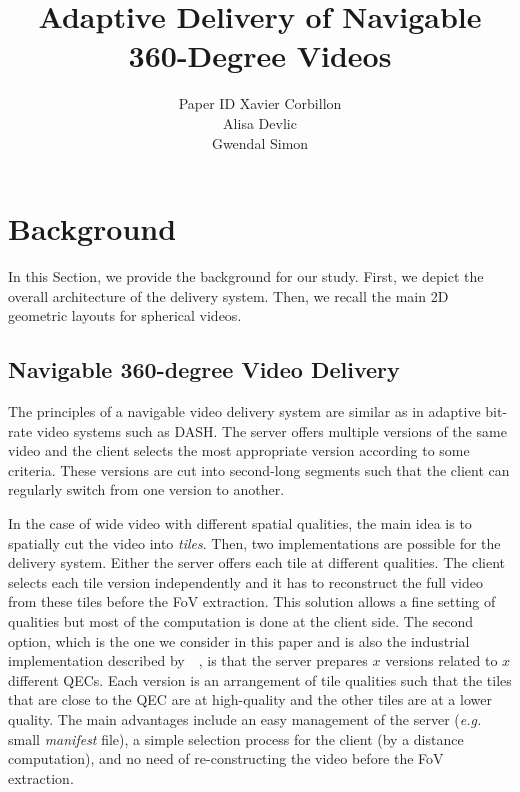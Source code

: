 \documentclass{sig-alternate}
\title{Adaptive Delivery of Navigable 360-Degree Videos}
\author{ 
\alignauthor
\ifdoubleBlinded
        Paper ID 
\else
  Xavier Corbillon\\
  \affaddr{T\'{e}l\'{e}com Bretagne, IRISA, France}%
\alignauthor
  Alisa Devlic\\
  \affaddr{T\'{e}l\'{e}com Bretagne, IRISA, France}%
\alignauthor
  Gwendal Simon\\
  \affaddr{T\'{e}l\'{e}com Bretagne, IRISA, France}%
\fi
}
\renewcommand\citet[1]{\citeauthor{#1}~\cite{#1}} %
\begin{document}

\maketitle





\section{Background}

In this Section, we provide the background for our study.
First, we depict the overall architecture of the delivery system.
Then, we recall the main 2D geometric layouts for spherical videos.

\subsection{Navigable 360-degree Video Delivery}

The principles of a navigable video delivery system are similar as in adaptive bit-rate
video systems such as \ac{DASH}. The server offers multiple versions of the same video 
and the client
selects the most appropriate version according to some criteria. These versions 
are cut into second-long segments such that the client can regularly switch from one 
version to another.

In the case of wide video with different spatial qualities, the main idea is to spatially cut 
the video into \emph{tiles}.
Then, two implementations are possible for the delivery system. Either the server 
offers each tile at different qualities. The client selects each tile version independently 
and it has to reconstruct
the full video from these tiles before the \ac{FoV} extraction. This solution allows a 
fine setting of qualities but 
most of the computation is done at the client side. The second option, 
which is the one we consider in this paper and is also the industrial implementation described 
by~\citet{facebook}, is that
the server prepares $x$ versions related to $x$ different \acp{QEC}. Each version 
is an arrangement of tile
qualities such that the tiles that are close to the \ac{QEC} are at high-quality 
and the other tiles
are at a lower quality. The main advantages include an easy management of the server 
(\textit{e.g.} small \emph{manifest} file), a simple selection process for the client (by
a distance computation), and no need of re-constructing the video before the \ac{FoV} extraction.
\end{document}
